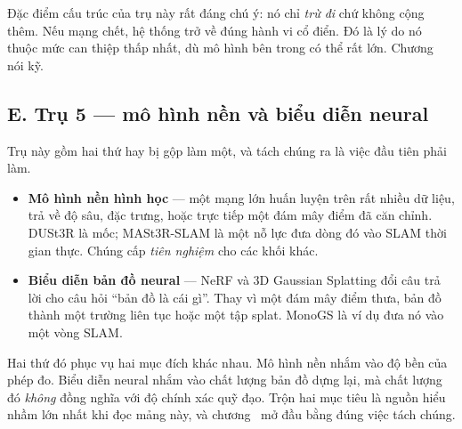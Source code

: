 \documentclass[../../deep_learning.tex]{subfiles}
\begin{document}
Đặc điểm cấu trúc của trụ này rất đáng chú ý: nó chỉ \emph{trừ đi} chứ không cộng thêm. Nếu mạng chết, hệ thống trở về đúng hành vi cổ điển. Đó là lý do nó thuộc mức can thiệp thấp nhất, dù mô hình bên trong có thể rất lớn. Chương~ nói kỹ.

\subsection{E. Trụ 5 --- mô hình nền và biểu diễn neural}
Trụ này gồm hai thứ hay bị gộp làm một, và tách chúng ra là việc đầu tiên phải làm.

\begin{itemize}
\item \textbf{Mô hình nền hình học} --- một mạng lớn huấn luyện trên rất nhiều dữ liệu, trả về độ sâu, đặc trưng, hoặc trực tiếp một đám mây điểm đã căn chỉnh. DUSt3R \cite{wang2024dust3r} là mốc; MASt3R-SLAM \cite{murai2025mast3rslam} là một nỗ lực đưa dòng đó vào SLAM thời gian thực. Chúng cấp \emph{tiên nghiệm} cho các khối khác.
\item \textbf{Biểu diễn bản đồ neural} --- NeRF \cite{mildenhall2020nerf} và 3D Gaussian Splatting \cite{kerbl20233dgs} đổi câu trả lời cho câu hỏi ``bản đồ là cái gì''. Thay vì một đám mây điểm thưa, bản đồ thành một trường liên tục hoặc một tập splat. MonoGS \cite{matsuki2024monogs} là ví dụ đưa nó vào một vòng SLAM.
\end{itemize}

Hai thứ đó phục vụ hai mục đích khác nhau. Mô hình nền nhắm vào độ bền của phép đo. Biểu diễn neural nhắm vào chất lượng bản đồ dựng lại, mà chất lượng đó \emph{không} đồng nghĩa với độ chính xác quỹ đạo. Trộn hai mục tiêu là nguồn hiểu nhầm lớn nhất khi đọc mảng này, và chương~ mở đầu bằng đúng việc tách chúng.
\end{document}
